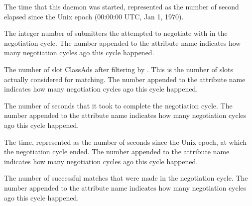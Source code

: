 \begin{description}

\item[\AdAttr{DaemonStartTime}:] The time that this daemon was
  started, represented as the number of second elapsed since
    the Unix epoch (00:00:00 UTC, Jan 1, 1970).

\label{attr:LastNegotiationCycleActiveSubmitterCount<X>}
\item[\AdAttr{LastNegotiationCycleActiveSubmitterCount<X>}:] The integer
  number of submitters
  the  attempted to negotiate with in the negotiation cycle.
  The number  appended to the attribute name indicates how
  many negotiation cycles ago this cycle happened.

\label{attr:LastNegotiationCycleCandidateSlots<X>}
\item[\AdAttr{LastNegotiationCycleCandidateSlots<X>}:] 
The number of slot ClassAds after filtering by 
.
This is the number of slots actually considered for matching.
The number  appended to the attribute name indicates how many 
negotiation cycles ago this cycle happened.

\label{attr:LastNegotiationCycleDuration<X>}
\item[\AdAttr{LastNegotiationCycleDuration<X>}:] The number of seconds
that it took to complete the negotiation cycle.  The number 
appended to the attribute name indicates how many negotiation cycles
ago this cycle happened.

\label{attr:LastNegotiationCycleEnd<X>}
\item[\AdAttr{LastNegotiationCycleEnd<X>}:] 
The time, represented as the number of seconds since the Unix epoch,
at which the negotiation cycle ended. 
The number  appended to the attribute name 
indicates how many negotiation cycles ago this cycle happened.

\label{attr:LastNegotiationCycleMatches<X>}
\item[\AdAttr{LastNegotiationCycleMatches<X>}:] The number of successful
  matches that were made in the negotiation cycle.  The number 
  appended to the attribute name indicates how many negotiation cycles
  ago this cycle happened.


\end{description}
